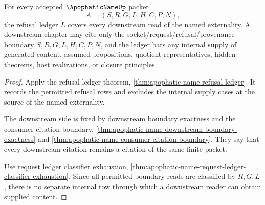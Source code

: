 \begin{theorem}
\label{thm:apophatic-name-refusal-ledger-downstream-coverage}
For every accepted $\ApophaticNameUp$ packet
$$
A=(S,R,G,L,H,C,P,N),
$$
the refusal ledger $L$ covers every downstream read of the named externality. A downstream chapter may cite only the socket/request/refusal/provenance boundary $S,R,G,L,H,C,P,N$, and the ledger bars any internal supply of generated content, assumed propositions, quotient representatives, hidden theorems, host realizations, or closure principles.
\end{theorem}
\begin{proof}
Apply the refusal ledger theorem, \autoref{thm:apophatic-name-refusal-ledger}. It records the permitted refusal rows and excludes the internal supply cases at the source of the named externality.

The downstream side is fixed by downstream boundary exactness and the consumer citation boundary, \autoref{thm:apophatic-name-downstream-boundary-exactness} and \autoref{thm:apophatic-name-consumer-citation-boundary}. They say that every downstream citation remains a citation of the same finite packet.

Use request ledger classifier exhaustion, \autoref{thm:apophatic-name-request-ledger-classifier-exhaustion}. Since all permitted boundary reads are classified by $R,G,L$, there is no separate internal row through which a downstream reader can obtain supplied content.
\end{proof}

